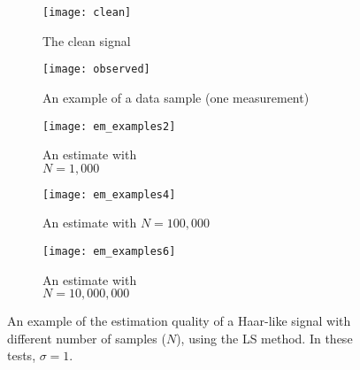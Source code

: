 \documentclass{IEEEtran}
\numberwithin{equation}{section}
\numberwithin{figure}{section}
\theoremstyle{plain}
\theoremstyle{definition}
\theoremstyle{remark}
\theoremstyle{plain}
\theoremstyle{remark}
\theoremstyle{plain}
\theoremstyle{plain}
\theoremstyle{remark}
\begin{document}
%
%
\begin{figure*}
    \begin{center}
        \begin{subfigure}[t]{.19\textwidth} 
        \begin{center}
                    \texttt{[image: clean]}
                            \end{center}
            \caption{The clean signal}
            \label{fig:clean_signal}
        \end{subfigure}     \hfill
        \begin{subfigure}[t]{.19\textwidth}
        \begin{center}
                    \texttt{[image: observed]}
        \end{center}
            \caption{An example of a data sample (one measurement)}
            \label{fig:corrupted_sig_1}
        \end{subfigure}   \hfill
        \begin{subfigure}[t]{.19\textwidth}
        \begin{center}
                    \texttt{[image: em\_examples2]}
        \end{center}
            \caption{An estimate with \\ $N=1,000$}
            \label{fig:estimation_N_1000}
        \end{subfigure}  \hfill
        \begin{subfigure}[t]{.19\textwidth}
        \begin{center}
            \texttt{[image: em\_examples4]}
        \end{center}
            \caption{An estimate with $N=100,000$}
            \label{fig:estimation_N_100000}
        \end{subfigure}   \hfill
        \begin{subfigure}[t]{.19\textwidth}
        \begin{center}
            \texttt{[image: em\_examples6]}
        \end{center}
            \caption{An estimate with \\ $N=10,000,000$}
            \label{fig:estimation_N_10000000}
        \end{subfigure}
        \caption{An example of the estimation quality of a Haar-like signal with different number of samples ($N$), using the LS method. In these tests, $\sigma=1$.}
        \label{fig:visualEstimating}
    \end{center}
\end{figure*}
\end{document}
